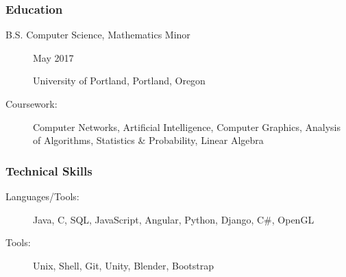\documentclass{article}
\begin{document}
\subsubsection*{Education}
    \begin{description}
        \item[B.S. Computer Science, Mathematics Minor]\hfill May 2017

        University of Portland, Portland, Oregon

        \vspace{0.5em}

        \item[Coursework:]
            Computer Networks, 
            Artificial Intelligence, 
            Computer Graphics, 
            Analysis of Algorithms,
            Statistics \& Probability,
            Linear Algebra
    \end{description}



\subsubsection*{Technical Skills}
    \begin{description}    
        \item[Languages/Tools:] 
            Java, 
            C, 
            SQL,
            JavaScript,
            Angular,
            Python,
            Django, 
            C\#,
            OpenGL

            \vspace{0.5em}

        \item[Tools:] 
            Unix,
            Shell,
            Git,
            Unity,
            Blender,
            Bootstrap

    \end{description}
\end{document}
